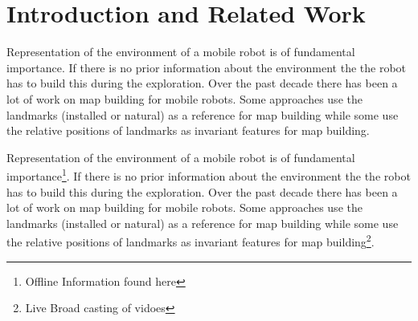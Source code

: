\documentclass{article}
\begin{document}
\section{Introduction and Related Work}

Representation of the environment of a mobile robot is of
fundamental importance. If there is no prior information about the
environment the the robot has to build this during the exploration.
Over the past decade there has been a lot of work on map building
for mobile robots. Some approaches use the landmarks (installed or
natural) as a reference for map building while some use the relative
positions of landmarks as invariant features for map building.

Representation of the environment of a mobile robot is of
fundamental importance\footnote{Offline Information found here}. If there is no prior information about the
environment the the robot has to build this during the exploration.
Over the past decade there has been a lot of work on map building
for mobile robots. Some approaches use the landmarks (installed or
natural) as a reference for map building while some use the relative
positions of landmarks as invariant features for map building\footnote{Live Broad casting of vidoes}.
\end{document}
